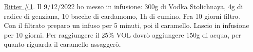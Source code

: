 \serves{-}%
\begin{ingreds}




\end{ingreds}

\begin{method}
\underline{Bitter \#1}. Il 9/12/2022 ho messo in infusione: 300g di Vodka Stolichnaya, 4g di radice di genziana, 10 bacche di cardamomo, 1h di cumino. Fra 10 giorni filtro. Con il filtrato preparo un infuso per 5 minuti, poi il caramello. Lascio in infusione per 10 giorni. Per raggiungere il 25\% VOL dovrò aggiungere 150g di acqua, per quanto riguarda il caramello assaggerò.

\end{method}




